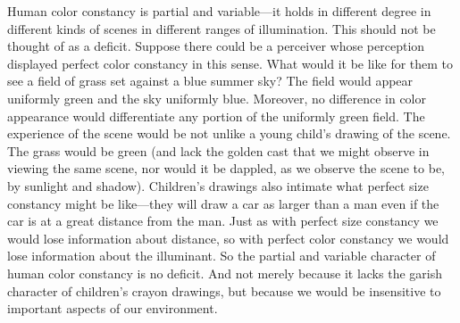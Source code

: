 \documentclass[12pt]{article}
\begin{document}
Human color constancy is partial and variable---it holds in different degree in different kinds of scenes in different ranges of illumination. This should not be thought of as a deficit. Suppose there could be a perceiver whose perception displayed perfect color constancy in this sense. What would it be like for them to see a field of grass set against a blue summer sky? The field would appear uniformly green and the sky uniformly blue. Moreover, no difference in color appearance would differentiate any portion of the uniformly green field. The experience of the scene would be not unlike a young child's drawing of the scene. The grass would be green (and lack the golden cast that we might observe in viewing the same scene, nor would it be dappled, as we observe the scene to be, by sunlight and shadow). Children's drawings also intimate what perfect size constancy might be like---they will draw a car as larger than a man even if the car is at a great distance from the man. Just as with perfect size constancy we would lose information about distance, so with perfect color constancy we would lose information about the illuminant. So the partial and variable character of human color constancy is no deficit. And not merely because it lacks the garish character of children's crayon drawings, but because we would be insensitive to important aspects of our environment.



 
 
\end{document}
